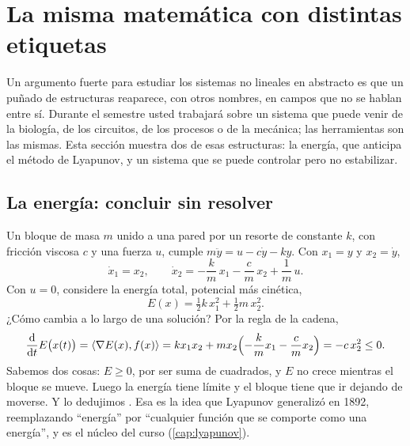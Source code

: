 \section{La misma matemática con distintas etiquetas}
\label{sec:in-energia}

Un argumento fuerte para estudiar los sistemas no lineales en abstracto es que un puñado de estructuras reaparece, con otros nombres, en campos que no se hablan entre sí. Durante el semestre usted trabajará sobre un sistema que puede venir de la biología, de los circuitos, de los procesos o de la mecánica; las herramientas son las mismas. Esta sección muestra dos de esas estructuras: la energía, que anticipa el método de Lyapunov, y un sistema que se puede controlar pero no estabilizar.

\subsection{La energía: concluir sin resolver}

Un bloque de masa $m$ unido a una pared por un resorte de constante $k$, con fricción viscosa $c$ y una fuerza $u$, cumple $m\ddot y=u-c\dot y-ky$. Con $x_1=y$ y $x_2=\dot y$,
\begin{equation}
  \dot x_1=x_2,\qquad \dot x_2=-\frac km\,x_1-\frac cm\,x_2+\frac1m\,u .
  \label{eq:in-masa}
\end{equation}
Con $u=0$, considere la energía total, potencial más cinética,
\begin{equation}
  E(x)=\tfrac12k\,x_1^2+\tfrac12m\,x_2^2 .
  \label{eq:in-energia}
\end{equation}
¿Cómo cambia a lo largo de una solución? Por la regla de la cadena,
\begin{equation}
  \frac{\mathrm{d}}{\mathrm{d} t}E\bigl(x(t)\bigr)=\left\langle \nabla E(x),f(x)\right\rangle=kx_1x_2+mx_2\Bigl(-\frac kmx_1-\frac cmx_2\Bigr)=-c\,x_2^2\le0 .
  \label{eq:in-dE}
\end{equation}
Sabemos dos cosas: $E\ge0$, por ser suma de cuadrados, y $E$ no crece mientras el bloque se mueve. Luego la energía tiene límite y el bloque tiene que ir dejando de moverse. Y lo dedujimos . Esa es la idea que Lyapunov generalizó en 1892, reemplazando ``energía'' por ``cualquier función que se comporte como una energía'', y es el núcleo del curso (\cref{cap:lyapunov}).

